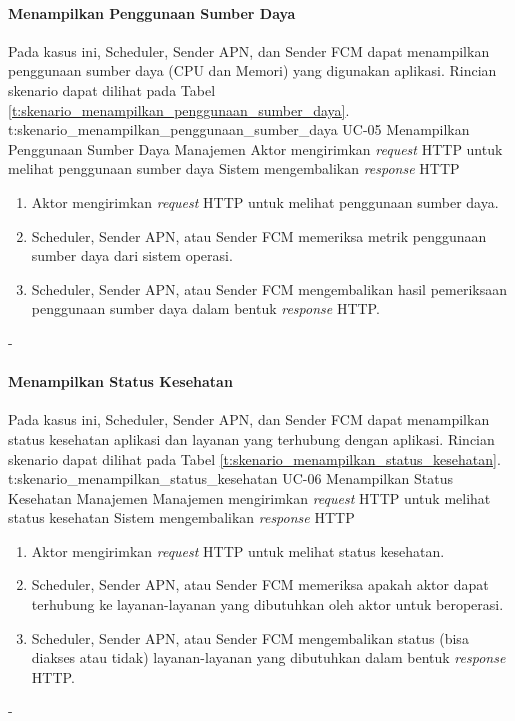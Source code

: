 \paragraph{Menampilkan Penggunaan Sumber Daya}
\par Pada kasus ini, Scheduler, Sender APN, dan Sender FCM dapat menampilkan penggunaan sumber daya (CPU dan Memori) yang digunakan aplikasi. Rincian skenario dapat dilihat pada Tabel \ref{t:skenario_menampilkan_penggunaan_sumber_daya}.
\tableUcDesc
{t:skenario_menampilkan_penggunaan_sumber_daya}
{UC-05}
{Menampilkan Penggunaan Sumber Daya}
{Manajemen}
{Aktor mengirimkan \textit{request} HTTP untuk melihat penggunaan sumber daya}
{Sistem mengembalikan \textit{response} HTTP}
{
\begin{enumerate}
	\item Aktor mengirimkan \textit{request} HTTP untuk melihat penggunaan sumber daya.
	\item Scheduler, Sender APN, atau Sender FCM memeriksa metrik penggunaan sumber daya dari sistem operasi.
	\item Scheduler, Sender APN, atau Sender FCM mengembalikan hasil pemeriksaan penggunaan sumber daya dalam bentuk \textit{response} HTTP.
\end{enumerate}
}
{-}

\paragraph{Menampilkan Status Kesehatan}
\par Pada kasus ini, Scheduler, Sender APN, dan Sender FCM dapat menampilkan status kesehatan aplikasi dan layanan yang terhubung dengan aplikasi. Rincian skenario dapat dilihat pada Tabel \ref{t:skenario_menampilkan_status_kesehatan}.
\tableUcDesc
{t:skenario_menampilkan_status_kesehatan}
{UC-06}
{Menampilkan Status Kesehatan}
{Manajemen}
{Manajemen mengirimkan \textit{request} HTTP untuk melihat status kesehatan}
{Sistem mengembalikan \textit{response} HTTP}
{
\begin{enumerate}
	\item Aktor mengirimkan \textit{request} HTTP untuk melihat status kesehatan.
	\item Scheduler, Sender APN, atau Sender FCM memeriksa apakah aktor dapat terhubung ke layanan-layanan yang dibutuhkan oleh aktor untuk beroperasi.
	\item Scheduler, Sender APN, atau Sender FCM mengembalikan status (bisa diakses atau tidak) layanan-layanan yang dibutuhkan dalam bentuk \textit{response} HTTP.
\end{enumerate}
}
{-}

